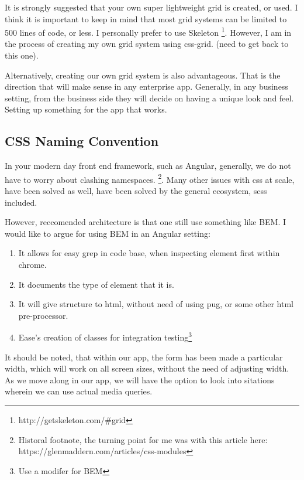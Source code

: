 It is strongly suggested that your own super lightweight grid is created, or
used. I think it is important to keep in mind that most grid systems can be
limited to 500 lines of code, or less. I personally prefer to use Skeleton
\footnote{http://getskeleton.com/\#grid}. However, I am in the process of
creating my own grid system using css-grid. (need to get back to this one).

Alternatively, creating our own grid system is also advantageous. That is the
direction that will make sense in any enterprise app. Generally, in any business
setting, from the business side they will decide on having a unique look and
feel. Setting up something for the app that works.

\subsection{ CSS Naming Convention }
In your modern day front end framework, such as Angular, generally, we do not
have to worry about clashing namespaces. \footnote{Historal footnote, the
turning point for me was with this article here:
https://glenmaddern.com/articles/css-modules}. Many other issues with css at
scale, have been solved as well, have been solved by the general ecosystem, scss
included.

However, reccomended architecture is that one still use something like BEM. I
would like to argue for using BEM in an Angular setting:
\begin{enumerate}
  \item It allows for easy grep in code base, when inspecting element first
  within chrome.
  \item It documents the type of element that it is.
  \item It will give structure to html, without need of using pug, or some other
  html pre-processor.
  \item Ease's creation of classes for integration testing\footnote{Use a modifer
  for BEM}
\end{enumerate}

It should be noted, that within our app, the form has been made a particular
width, which will work on all screen sizes, without the need of adjusting width.
As we move along in our app, we will have the option to look into sitations
wherein we can use actual media queries.
